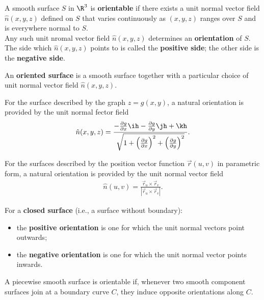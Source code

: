 \documentclass{article}
\begin{document}
\begin{definition}
	A smooth surface $S$ in $\R^3$ is \textbf{orientable} if there exists a unit normal vector
	field $\hat n(x,y,z)$ defined on $S$ that varies continuously as $(x,y,z)$ ranges over $S$
	and is everywhere normal to $S$.\\
	Any such unit nromal vector field $\hat n(x,y,z)$ determines an \textbf{orientation} of $S$.
	The side which $\hat n(x,y,z)$ points to is called the \textbf{positive side}; the other side is the
	\textbf{negative side}.
\end{definition}
\begin{definition}
	An \textbf{oriented surface} is a smooth surface together with a particular choice of unit
	normal vector field $\hat n(x,y,z)$.
\end{definition}
\begin{lemma}
	For the surface described by the graph $z=g(x,y)$, a natural orientation is provided by
	the unit normal fector field
	\begin{align*}
		\hat n(x,y,z)=\frac{-\frac{\partial g}{\partial x}\ih -\frac{\partial g}{\partial y}\jh + \kh}{\sqrt{1+\left(\frac{\partial g}{\partial x}\right)^2 + \left(\frac{\partial g}{\partial y}\right)^2}}.
	\end{align*}
\end{lemma}
\begin{lemma}
	For the surfaces described by the position vector function $\vec r(u,v)$ in parametric form,
	a natural orientation is provided by the unit normal vector field
	\begin{align*}
		\hat n(u,v) = \frac{\vec r_u \times \vec r_v}{|\vec r_u \times \vec r_v|}.
	\end{align*}
\end{lemma}
\begin{definition}
	For a \textbf{closed surface} (i.e., a surface without boundary):
	\begin{itemize}
		\item the \textbf{positive orientation} is one for which the unit normal vectors point outwards;
		\item the \textbf{negative orientation} is one for which the unit normal vector points inwards.
	\end{itemize}
\end{definition}
\begin{definition}
	A piecewise smooth surface is orientable if, whenever two smooth component surfaces join
	at a boundary curve $C$, they induce opposite orientations along $C$.
\end{definition}
\end{document}
